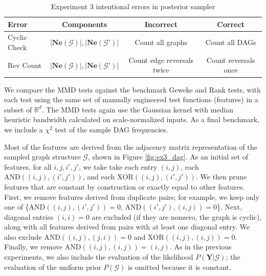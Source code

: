 \documentclass[a4paper,11pt]{article}
\begin{document}
\begin{table}
    \centering
    \begin{tabular}{l|c|c|c}
          Error & Components & Incorrect & Correct \\
         \hline
         Cyclic Check & $|\mathbf{Ne}(\mathcal{G})|, |\mathbf{Ne}(\mathcal{G}')|$ & Count all graphs & Count all DAGs \\
         Rev Count & $|\mathbf{Ne}(\mathcal{G})|, |\mathbf{Ne}(\mathcal{G}')|$ & Count edge reversals twice & Count reversals once \\
    \end{tabular}
    \caption{Experiment 3 intentional errors in posterior sampler}
    \label{tab:ex3_errors}
\end{table}

We compare the MMD tests against the benchmark Geweke and Rank tests, with each test using the same set of manually engineered test functions (features) in a subset of $\mathbb{R}^{d}$. The MMD tests again use the Gaussian kernel with median heuristic bandwidth calculated on scale-normalized inputs. As a final benchmark, we include a $\chi^{2}$ test of the sample DAG frequencies. 

Most of the features are derived from the adjacency matrix representation of the sampled graph structure $\mathcal{G}$, shown in Figure \ref{fig:ex3_dag}. As an initial set of features, for all $i,j,i',j'$, we take
take each entry $(i,j)$, each $\mathrm{AND}((i,j),(i',j'))$, and each $\mathrm{XOR}((i,j),(i',j'))$. We then prune features that are constant by construction or exactly equal to other features. First, we remove features derived from duplicate pairs; for example, we keep only one of \{$\mathrm{AND}((i,j),(i',j'))=0$, $\mathrm{AND}((i',j'),(i,j))=0$\}. Next, diagonal entries $(i,i)=0$ are excluded (if they are nonzero, the graph is cyclic), along with all features derived from pairs with at least one diagonal entry. We also exclude $\mathrm{AND}((i,j),(j,i))=0$ and $\mathrm{XOR}((i,j),(i,j))=0$. Finally, we remove $\mathrm{AND}((i,j),(i,j)) = (i,j)$. As in the previous experiments, we also include the evaluation of the likelihood $P(\mathbf{Y}|\mathcal{G})$; the evaluation of the uniform prior $P(\mathcal{G})$ is omitted because it is constant.
\end{document}

